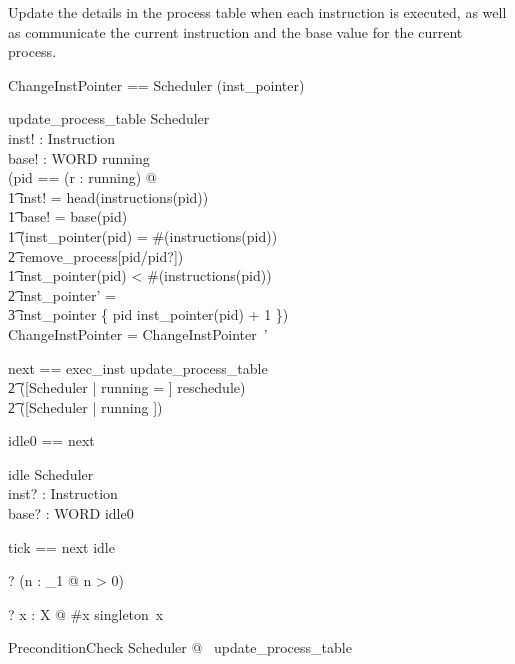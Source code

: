 \documentclass{article}
\begin{document}
Update the details in the process table when each instruction is
executed, as well as communicate the current instruction and the base
value for the current process.

\begin{zed}
  ChangeInstPointer == Scheduler \hide (inst\_pointer)
\end{zed}

\begin{schema}{update\_process\_table}
  \Delta Scheduler\\
  inst! : Instruction\\
  base! : WORD
\where
  running \neq \emptyset\\
  (\exists pid == (\mu r : running) @\\
    \t1 inst! = head(instructions(pid)) \land\\
    \t1 base! = base(pid) \land\\
    \t1 (inst\_pointer(pid) = \#(instructions(pid)) \implies\\
      \t2 remove\_process[pid/pid?]) \land\\
    \t1 inst\_pointer(pid) < \#(instructions(pid)) \implies\\
      \t2 inst\_pointer' = \\
        \t3 inst\_pointer \oplus \{ pid \mapsto inst\_pointer(pid) + 1 \})\\
   \theta ChangeInstPointer = \theta ChangeInstPointer~'
\end{schema}

\begin{zed}
  next == exec\_inst \pipe update\_process\_table \semi{} \\
    \t2 ([\Delta Scheduler | running = \emptyset] \land reschedule) \lor\\
    \t2 ([\Xi Scheduler | running \neq \emptyset])
\end{zed}

\begin{zed}
  idle0 == \lnot \pre next
\end{zed}

\begin{schema}{idle}
  \Xi Scheduler\\
  inst? : Instruction\\
  base? : WORD
\where
  idle0
\end{schema}

\begin{zed}
  tick == next \lor idle
\end{zed}

\begin{zed}
  \vdash? (\forall n : \nat_1 @ n > 0)
\end{zed}
\begin{zed}
  [X] \vdash? \forall x : \power X @ \#x  \iff singleton~x
\end{zed}

\begin{theorem}{PreconditionCheck}
   \forall Scheduler @ \pre~update\_process\_table
\end{theorem}

\ZDeclSummary
\end{document}
